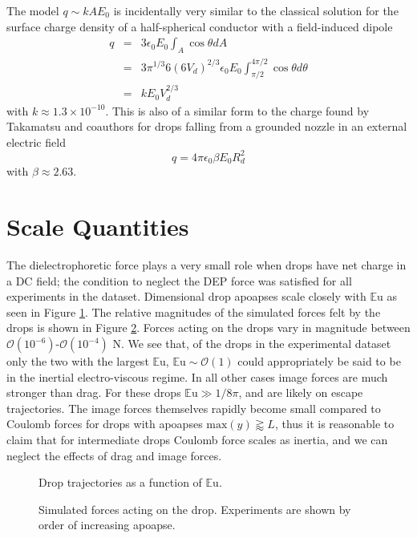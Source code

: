 \documentclass[12pt,a4paper,oneside]{book}
\begin{document}
The model $q \sim kAE_0$ is incidentally very similar to the classical solution for the surface charge density of a half-spherical conductor with a field-induced dipole \cite{david_j._griffiths_introduction_1999}
\begin{eqnarray*}
q &=& 3 \epsilon_0 E_0 \int_A \cos \theta dA \\
&=& 3 \pi^{1/3} 6 \left(6 V_d \right)^{2/3} \epsilon_0 E_0 \int^{4 \pi/2}_{\pi / 2} \cos \theta d\theta \\
&=& k E_0 V_d^{2/3}
\end{eqnarray*}
with $k \approx 1.3 \times 10^{-10}$. This is also of a similar form to the charge found by Takamatsu and coauthors for drops falling from a grounded nozzle in an external electric field \cite{takamatsu_theoretical_1981}
\[q = 4 \pi \epsilon_0 \beta E_0 R_d^2 \]
with $\beta \approx 2.63$.

\section{Scale Quantities}
The dielectrophoretic force plays a very small role when drops have net charge in a DC field; the condition to neglect the DEP force was satisfied for all experiments in the dataset. Dimensional drop apoapses scale closely with $\mathbb{E}\mbox{u}$ as seen in Figure \ref{fig:series_s_eu}. The relative magnitudes of the simulated forces felt by the drops is shown in Figure \ref{fig:forces}. Forces acting on the drops vary in magnitude between $\mathcal{O}(10^{-6})$-$\mathcal{O}(10^{-4})$ N. We see that, of the drops in the experimental dataset only the two with the largest $\mathbb{E}\mbox{u}$, $\mathbb{E}\mbox{u} \sim \mathcal{O}(1)$ could appropriately be said to be in the inertial electro-viscous regime. In all other cases image forces are much stronger than drag. For these drops $\mathbb{E}\mbox{u} \gg 1/8 \pi$, and are likely on escape trajectories. The image forces themselves rapidly become small compared to Coulomb forces for drops with apoapses $\mbox{max}\left( y\right) \gtrapprox L$, thus it is reasonable to claim that for intermediate drops Coulomb force scales as inertia, and we can neglect the effects of drag and image forces.

\begin{figure}[htb]
    \centering
    
    \caption{Drop trajectories as a function of $\mathbb{E}\mbox{u}$.\label{fig:series_s_eu}}
\end{figure}
\begin{figure}[htb]
    \centering
    \resizebox{14cm}{!}{}
    \caption{Simulated forces acting on the drop. Experiments are shown by order of increasing apoapse.\label{fig:forces}}
\end{figure}
\end{document}

